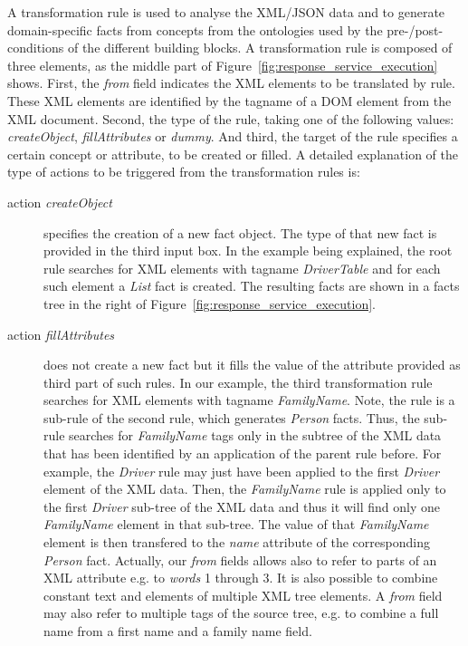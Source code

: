 \documentclass{fast_latex}
\begin{document}
A transformation rule is used to analyse the XML/JSON data and to generate domain-specific facts from concepts from the ontologies used by the pre-/post-conditions of the different building blocks. A transformation rule is composed of three elements, as the middle part of Figure~\ref{fig:response_service_execution} shows. First, the \textit{from} field indicates the XML elements to be translated by rule. These XML elements are identified by the tagname of a DOM element from the XML document. Second, the type of the rule, taking one of the following values: \emph{createObject}, \emph{fillAttributes} or \emph{dummy}. And third, the target of the rule specifies a certain concept or attribute, to be created or filled. A detailed explanation of the type of actions to be triggered from the transformation rules is:
\begin{description}
	\item[action \emph{createObject}] specifies the creation of a new fact object. The type of that new fact is provided in the third input box. In the example being explained, the root rule searches for XML elements with tagname \emph{DriverTable} and for each such element a \emph{List} fact is created. The resulting facts are shown in a facts tree in the right of Figure~\ref{fig:response_service_execution}.
	\item[action \emph{fillAttributes}] does not create a new fact but it fills the value of the attribute provided as third part of such rules. In our example, the third transformation rule searches for XML elements with tagname \emph{FamilyName}. Note, the rule is a sub-rule of the second rule, which generates \emph{Person} facts. Thus, the sub-rule searches for \emph{FamilyName} tags only in the subtree of the XML data that has been identified by an application of the parent rule before. For example, the \emph{Driver} rule may just have been applied to the first \emph{Driver} element of the XML data. Then, the \emph{FamilyName} rule is applied only to the first \emph{Driver} sub-tree of the XML data and thus it will find only one \emph{FamilyName} element in that sub-tree. The value of that \emph{FamilyName} element is then transfered to the \emph{name} attribute of the corresponding \emph{Person} fact. Actually, our \textit{from} fields allows also to refer to parts of an XML attribute e.g. to \textit{words} 1 through 3. It is also possible to combine constant text and elements of multiple XML tree elements. A \textit{from} field may also refer to multiple tags of the source tree, e.g. to combine a full name from a first name and a family name field.  

\end{description}
\end{document}
